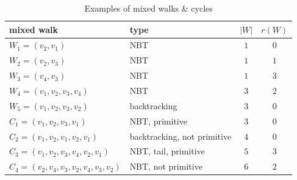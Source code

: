 \documentclass{article}
\theoremstyle{plain}
\begin{document}
\begin{table}[tb]
	\caption{Examples of mixed walks \& cycles}
	\begin{tabular}{llcc}\hline
		mixed walk                                  & type                        & $\left| W \right|$ & $r(W)$
		\\\hline
		$W_1 = (v_2, v_1)$                          & NBT                         & $1$                & $0$
		\\\hline
		$W_2 = (v_2, v_3)$                          & NBT                         & $1$                & $1$
		\\\hline
		$W_3 = (v_4, v_3)$                          & NBT                         & $1$                & $3$
		\\\hline
		$W_4 = (v_1, v_2, v_3, v_4)$                & NBT                         & $3$                & $2$
		\\\hline
		$W_5 = (v_1, v_2, v_3, v_2)$                & backtracking                & $3$                & $0$
		\\\hline
		$C_1 = (v_1, v_2, v_3, v_1)$                & NBT, primitive              & $3$                & $0$
		\\\hline
		$C_2 = (v_1, v_2, v_1, v_2, v_1)$           & backtracking, not primitive & $4$                & $0$
		\\\hline
		$C_3 = (v_1, v_2, v_3, v_4, v_2, v_1)$      & NBT, tail, primitive        & $5$                & $3$
		\\\hline
		$C_4 = (v_2, v_4, v_3, v_2, v_4, v_3, v_2)$ & NBT, not primitive          & $6$                & $2$
		\\\hline
	\end{tabular}
	\label{table1:appendix:notations}
\end{table}
\end{document}
